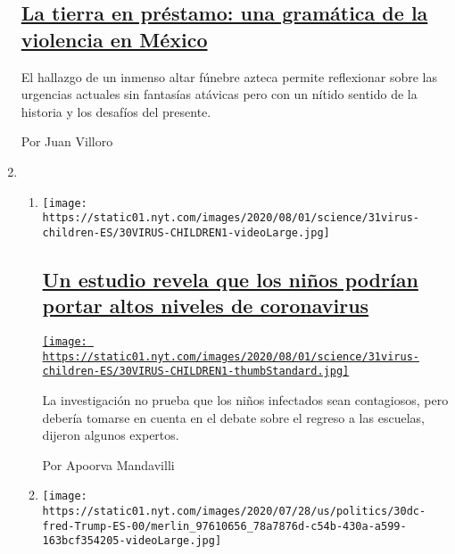 \begin{enumerate}
  \hypertarget{la-tierra-en-pruxe9stamo-una-gramuxe1tica-de-la-violencia-en-muxe9xico}{%
  \subsection{\texorpdfstring{\href{/es/2020/07/30/espanol/opinion/aztecas-violencia-narco-amlo.html}{La
  tierra en préstamo: una gramática de la violencia en
  México}}{La tierra en préstamo: una gramática de la violencia en México}}\label{la-tierra-en-pruxe9stamo-una-gramuxe1tica-de-la-violencia-en-muxe9xico}}

  El hallazgo de un inmenso altar fúnebre azteca permite reflexionar
  sobre las urgencias actuales sin fantasías atávicas pero con un nítido
  sentido de la historia y los desafíos del presente.

  Por Juan Villoro
\item
  \begin{enumerate}
  \def\labelenumii{\arabic{enumii}.}
  \item
    \texttt{[image: https://static01.nyt.com/images/2020/08/01/science/31virus-children-ES/30VIRUS-CHILDREN1-videoLarge.jpg]}

    \hypertarget{un-estudio-revela-que-los-niuxf1os-podruxedan-portar-altos-niveles-de-coronavirus}{%
    \subsection{\texorpdfstring{\href{/es/2020/07/31/espanol/ciencia-y-tecnologia/ninos-contagio-coronavirus.html}{Un
    estudio revela que los niños podrían portar altos niveles de
    coronavirus}}{Un estudio revela que los niños podrían portar altos niveles de coronavirus}}\label{un-estudio-revela-que-los-niuxf1os-podruxedan-portar-altos-niveles-de-coronavirus}}

    \href{/es/2020/07/31/espanol/ciencia-y-tecnologia/ninos-contagio-coronavirus.html}{\texttt{[image: https://static01.nyt.com/images/2020/08/01/science/31virus-children-ES/30VIRUS-CHILDREN1-thumbStandard.jpg]}}

    La investigación no prueba que los niños infectados sean
    contagiosos, pero debería tomarse en cuenta en el debate sobre el
    regreso a las escuelas, dijeron algunos expertos.

    Por Apoorva Mandavilli
  \item
    \texttt{[image: https://static01.nyt.com/images/2020/07/28/us/politics/30dc-fred-Trump-ES-00/merlin\_97610656\_78a7876d-c54b-430a-a599-163bcf354205-videoLarge.jpg]}


\end{enumerate}
\end{enumerate}
